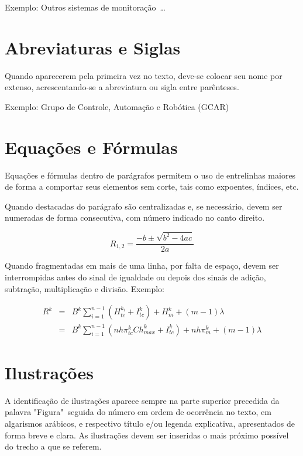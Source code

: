 \documentclass[repeatfields,xlists,xpacks,oneside,yearsonly]{ufrgscca}
\begin{document}
Exemplo: Outros sistemas de
monitoração~\cite{Baturone:DCIS1996-231,Cota:TIM-49-2}\ldots\\

\section{Abreviaturas e Siglas}

Quando aparecerem pela primeira vez no texto, deve-se colocar seu nome por
extenso, acrescentando-se a abreviatura ou sigla entre parênteses.

Exemplo:   Grupo de Controle, Automação e Robótica (GCAR)

\section{Equações e Fórmulas}

Equações e fórmulas dentro de parágrafos permitem o uso de entrelinhas
maiores de forma a comportar seus elementos sem corte, tais como expoentes,
índices, etc.

Quando destacadas do parágrafo são centralizadas e, se necessário, devem ser
numeradas de forma consecutiva, com número indicado no canto direito.

\begin{equation}
R_{1,2}=\frac{-b\pm\sqrt{b^2-4ac}}{2a}
\end{equation}

Quando fragmentadas em mais de uma linha, por falta de espaço, devem ser
interrompidas antes do sinal de igualdade ou depois dos sinais de adição,
subtração, multiplicação e divisão. Exemplo:

\begin{eqnarray}
R^k &=& B^k \sum_{i=1}^{n-1}{\left(H_{tc}^{k_i}+I_{tc}^k\right)}+H_m^k+(m-1)\lambda \nonumber\\
&=& B^k \sum_{i=1}^{n-1}{\left(nh\pi_{tc}^kCh_{max}^k+I_{tc}^k\right)}+nh\pi_m^k+(m-1)\lambda
\end{eqnarray}


\section{Ilustrações}

A identificação de ilustrações aparece sempre na parte superior precedida da
palavra "Figura"\ seguida do número em ordem de ocorrência no texto, em
algarismos arábicos, e respectivo título e/ou legenda explicativa,
apresentados de forma breve e clara. As ilustrações devem ser inseridas o
mais próximo possível do trecho a que se referem.
\end{document}
